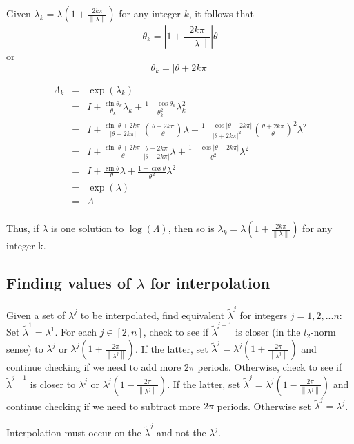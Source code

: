\documentclass[10pt,letterpaper,oneside,notitlepage]{article}
\begin{document}
Given $\lambda_k = \lambda \left( 1 + \frac{2k\pi}{\left\| \lambda \right\|}\right)$ for any integer $k$, it follows that 
\begin{equation}
\theta_k = \left| 1 + \frac{2k\pi}{\left\|\lambda\right\|}\right| \theta
\end{equation}
or
\begin{equation}
\theta_k =  \left|\theta + 2k\pi\right|
\end{equation}

\begin{eqnarray*}
\Lambda_k
&=&  \exp(\lambda_k) \\
&=&  I + \frac{\sin\theta_k}{\theta_k}\lambda_k + \frac{1-\cos\theta_k}{\theta_k^2}\lambda_k^2  \\
&=&  I + \frac{\sin\left|\theta + 2k\pi\right|}{\left|\theta + 2k\pi\right|}\left( \frac{\theta+2k\pi}{\theta}\right)\lambda + \frac{1-\cos\left|\theta + 2k\pi\right|}{\left|\theta + 2k\pi\right|^2}\left(\frac{\theta+2k\pi}{\theta}\right)^2\lambda^2  \\
&=&  I + \frac{\sin\left|\theta + 2k\pi\right|}{\theta} 
         \frac{\theta + 2k\pi}{\left|\theta + 2k\pi\right|}\lambda + \frac{1-\cos\left|\theta + 2k\pi\right|}{\theta^2}\lambda^2\\
&=&  I + \frac{\sin\theta}{\theta} \lambda + \frac{1-\cos\theta}{\theta^2}\lambda^2\\
&=& \exp(\lambda) \\
&=& \Lambda \\
\end{eqnarray*}

Thus, if $\lambda$ is one solution to $\log(\Lambda)$, then so is 
$\lambda_k = \lambda \left( 1 + \frac{2k\pi}{\left\| \lambda \right\|}\right)$ for any integer k.

\subsection{Finding values of $\lambda$ for interpolation} 
Given a set of $\lambda^j$ to be interpolated, find equivalent $\tilde{\lambda}^j$ for integers $j=1,2,...n$:
Set $\tilde{\lambda}^1 = \lambda^1$.
For each $j\in\left[2,n\right]$, 
check to see if $\tilde{\lambda}^{j-1}$ is closer (in the $l_2$-norm sense) to 
$\lambda^j$ or $\lambda^j \left( 1 + \frac{2\pi}{\left\| \lambda^j \right\|}\right)$. 
If the latter, set $\tilde{\lambda}^{j}=\lambda^j \left( 1 + \frac{2\pi}{\left\| \lambda^j \right\|}\right)$ and continue checking if we need to add more $2\pi$ periods.
Otherwise, check to see if $\tilde{\lambda}^{j-1}$ is closer to 
$\lambda^j$ or $\lambda^j \left( 1 - \frac{2\pi}{\left\| \lambda^j \right\|}\right)$. 
If the latter, set $\tilde{\lambda}^{j}=\lambda^j \left( 1 - \frac{2\pi}{\left\| \lambda^j \right\|}\right)$ and continue checking if we need to subtract more $2\pi$ periods.
Otherwise set $\tilde{\lambda}^{j} = \lambda^j$.


Interpolation must occur on the $\tilde{\lambda}^{j}$ and not the $\lambda^j$.
\end{document}
